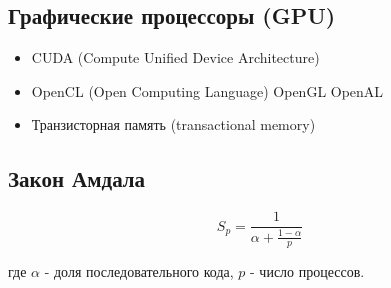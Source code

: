 \subsection{Графические процессоры (GPU)}

\begin{itemize}
	\item CUDA (Compute Unified Device Architecture)
	\item OpenCL (Open Computing Language) OpenGL OpenAL
	\item Транзисторная память (transactional memory)
\end{itemize}

\subsection{Закон Амдала}

\[
S_p = \frac{1}{\alpha + \frac{1 - \alpha}{p}}
\]

\noindent где $\alpha$ - доля последовательного кода, $p$ - число процессов.

\newpage

\tableofcontents

